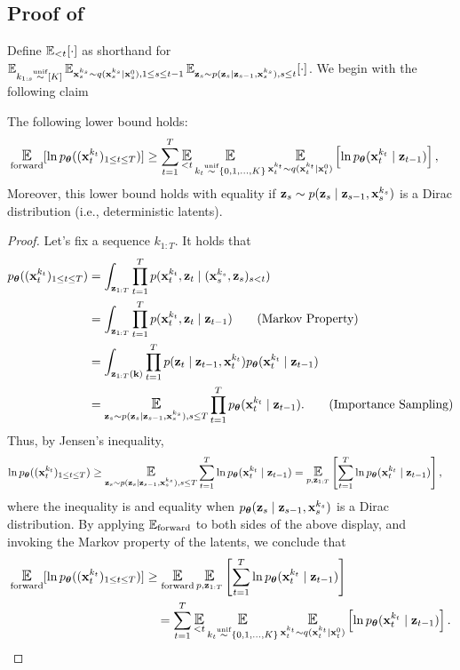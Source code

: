 \subsection{Proof of }\label{sec:proof:thm:main_elbo}

Define $\Exp_{< t}[\cdot]$ as shorthand for $\Exp_{k_{1:s}\unifsim [K]}\Exp_{\bx_{s}^{k_s}\sim q(\bx_{s}^{k_s} \mid \bx_s^0),1 \le s \le t-1}\Exp_{\bz_{s} \sim p (\bz_{s} \mid \bz_{s-1},\bx_s^{k_s}), s\le t} [\cdot]$. We begin with the following claim
\begin{claim}\label{claim:first_claim} The following lower bound holds:
\begin{align}
\Eforward[\ln  \ptheta((\bx_{t}^{k_t})_{1 \le t \le T})] &\ge \sum_{t=1}^T \Exp_{<t}\Exp_{k_t \unifsim\{0,1,\dots,K\}}\Exp_{\bx_t^{k_t} \sim q(\bx_t^{k_t} \mid \bx_t^0)}\left[\ln \ptheta(\bx_{t}^{k_t} \mid \bz_{t-1})\right],
\end{align}
Moreover, this lower bound holds with equality if $\mathbf{z}_{s} \sim p (\mathbf{z}_{s} \mid \mathbf{z}_{s-1},\mathbf{x}_s^{k_s})$ is a Dirac distribution (i.e., deterministic latents).
\end{claim}
\begin{proof}
Let's fix a sequence $k_{1:T}$. It holds that
\begin{align}
\ptheta((\bx_{t}^{k_t})_{1 \le t \le T}) &= \int_{\bz_{1:T} } \prod_{t=1}^T p (\bx_{t}^{k_t}, \bz_{t}\mid (\bx_s^{k_s},\bz_{s})_{s < t}) \nonumber\\
    &= \int_{\bz_{1:T}} \prod_{t=1}^T p (\bx_{t}^{k_t}, \bz_{t}\mid \bz_{t-1}) \tag{Markov Property}\\
    &= \int_{\bz_{1:T}(\veck)} \prod_{t=1}^Tp (\bz_{t} \mid \bz_{t-1},\bx_t^{k_t}) \ptheta(\bx_{t}^{k_t} \mid \bz_{t-1}) \nonumber\\
    &= \Exp_{\bz_{s} \sim p (\bz_{s} \mid \bz_{s-1},\bx_s^{k_s}), s\le T} \prod_{t=1}^T \ptheta(\bx_{t}^{k_t} \mid \bz_{t-1}). \tag{Importance Sampling}
\end{align}
Thus, by Jensen's inequality, 
\begin{align*}
\ln  \ptheta((\bx_{t}^{k_t})_{1 \le t \le T}) &\ge \Exp_{\bz_{s} \sim p (\bz_{s} \mid \bz_{s-1},\bx_s^{k_s}), s\le T} \sum_{t=1}^T \ln \ptheta(\bx_{t}^{k_t} \mid \bz_{t-1}) = \Epz\left[\sum_{t=1}^T \ln \ptheta(\bx_{t}^{k_t} \mid \bz_{t-1})\right],
\end{align*}
where the inequality is and equality when $p_{\bm{\theta}}(\mathbf{z}_s \mid \mathbf{z}_{s-1},\mathbf{x}_s^{k_s})$ is a Dirac distribution. By applying $\Eforward$ to both sides of the above display, and invoking the Markov property of the latents, we conclude that
\begin{align*}
\Eforward[\ln  \ptheta((\bx_{t}^{k_t})_{1 \le t \le T})] &\ge \Eforward\Epz\left[\sum_{t=1}^T \ln \ptheta(\bx_{t}^{k_t} \mid \bz_{t-1})\right] \\
&\quad=  \sum_{t=1}^T \Exp_{<t}\Exp_{k_t \unifsim\{0,1,\dots,K\}}\Exp_{\bx_t^{k_t} \sim q(\bx_t^{k_t} \mid \bx_t^0)}\left[\ln \ptheta(\bx_{t}^{k_t} \mid \bz_{t-1})\right].
\end{align*}
\end{proof}
